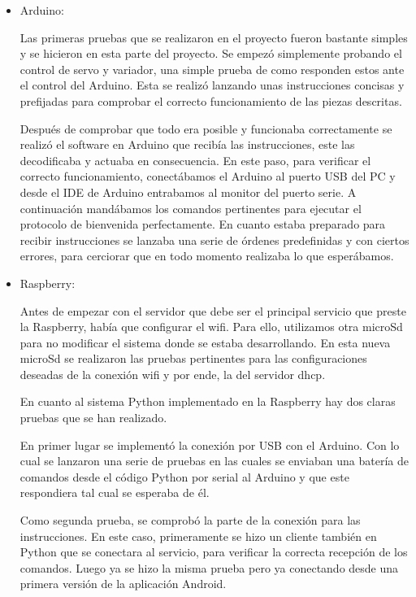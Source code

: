 \documentclass{pclass}
\begin{document}
\begin{itemize}
	\item Arduino:
	
		Las primeras pruebas que se realizaron en el proyecto fueron bastante simples y se hicieron en esta parte del proyecto. Se empezó simplemente probando el control de servo y variador, una simple prueba de como responden estos ante el control del Arduino. Esta se realizó lanzando unas instrucciones concisas y prefijadas para comprobar el correcto funcionamiento de las piezas descritas.
		
		Después de comprobar que todo era posible y funcionaba correctamente se realizó el software en Arduino que recibía las instrucciones, este las decodificaba y actuaba en consecuencia. En este paso, para verificar el correcto funcionamiento, conectábamos el Arduino al puerto USB del PC y desde el IDE de Arduino entrabamos al monitor del puerto serie. A continuación mandábamos los comandos pertinentes para ejecutar el protocolo de bienvenida perfectamente. En cuanto estaba preparado para recibir instrucciones se lanzaba una serie de órdenes predefinidas y con ciertos errores, para cerciorar que en todo momento realizaba lo que esperábamos. 
		
	\item Raspberry:
	
		Antes de empezar con el servidor que debe ser el principal servicio que preste la Raspberry, había que configurar el wifi. Para ello, utilizamos otra microSd para no modificar el sistema donde se estaba desarrollando. En esta nueva microSd se realizaron las pruebas pertinentes para las configuraciones deseadas de la conexión wifi y por ende, la del servidor dhcp.
	
		En cuanto al sistema Python implementado en la Raspberry hay dos claras pruebas que se han realizado.
		
		En primer lugar se implementó la conexión por USB con el Arduino. Con lo cual se lanzaron una serie de pruebas en las cuales se enviaban una batería de comandos desde el código Python por serial al Arduino y que este respondiera tal cual se esperaba de él.
		
		Como segunda prueba, se comprobó la parte de la conexión para las instrucciones. En este caso, primeramente se hizo un cliente también en Python que se conectara al servicio, para verificar la correcta recepción de los comandos. Luego ya se hizo la misma prueba pero ya conectando desde una primera versión de la aplicación Android.
		

\end{itemize}
\end{document}
